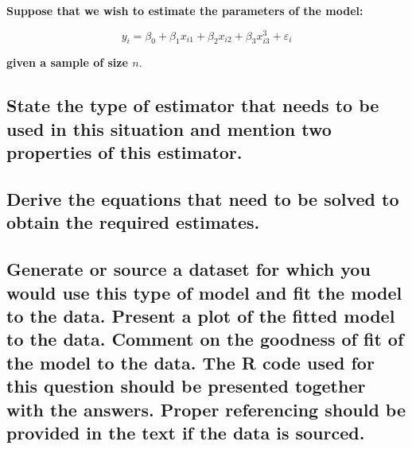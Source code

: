 \documentclass[]{article}
\begin{document}
\textbf{Suppose that we wish to estimate the parameters of the model:}

$$
y_i = \beta_0 + \beta_1 x_{i1} + \beta_2 x_{i2} + \beta_3 x_{i3}^3 + \varepsilon_i
$$

\noindent \textbf{given a sample of size $n$}.

\subsection{State the type of estimator that needs to be used in this situation and mention two properties of this estimator.}

\subsection{Derive the equations that need to be solved to obtain the required estimates.}

\subsection{ Generate or source a dataset for which you would use this type of model and fit the model to the data.  Present a plot of the fitted model to the data.  Comment on the goodness of fit of the model to the data.  The R code used for this question should be presented together with the answers. Proper referencing should be provided in the text if the data is sourced.}
\end{document}
